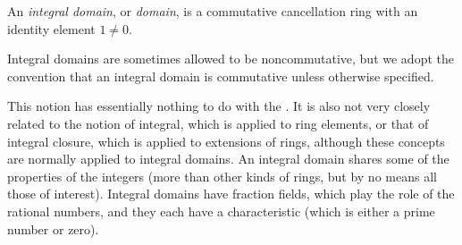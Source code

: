 \documentclass[12pt]{article}
\begin{document}
An \emph{integral domain}, or \emph{domain}, is a commutative cancellation ring with an identity element $1 \neq 0$.

Integral domains are sometimes allowed to be noncommutative, but we adopt the convention that an integral domain is commutative unless otherwise specified.

This notion has essentially nothing to do with the .  It is also not very closely related to the notion of integral, which is applied to ring elements, or that of integral closure, which is applied to extensions of rings, although these concepts are normally applied to integral domains.  An integral domain shares some of the properties of the integers (more than other kinds of rings, but by no means all those of interest).  Integral domains have fraction fields, which play the role of the rational numbers, and they each have a characteristic (which is either a prime number or zero).
\end{document}
